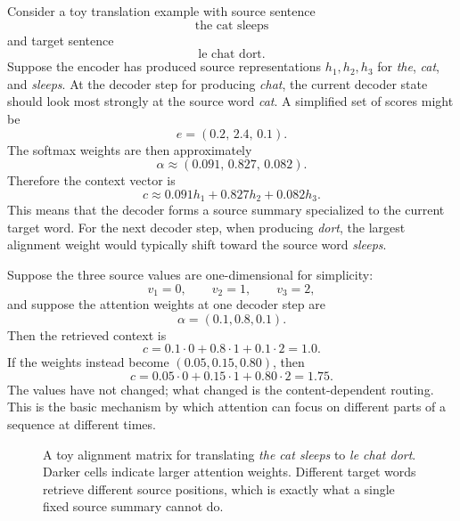 Consider a toy translation example with source sentence
\[
 \text{the cat sleeps}
\]
and target sentence
\[
 \text{le chat dort}.
\]
Suppose the encoder has produced source representations $h_1,h_2,h_3$ for \emph{the}, \emph{cat}, and \emph{sleeps}.
At the decoder step for producing \emph{chat}, the current decoder state should look most strongly at the source word \emph{cat}.
A simplified set of scores might be
\[
 e=(0.2,\,2.4,\,0.1).
\]
The softmax weights are then approximately
\[
 \alpha\approx(0.091,\,0.827,\,0.082).
\]
Therefore the context vector is
\[
 c \approx 0.091 h_1 + 0.827 h_2 + 0.082 h_3.
\]
This means that the decoder forms a source summary specialized to the current target word.
For the next decoder step, when producing \emph{dort}, the largest alignment weight would typically shift toward the source word \emph{sleeps}.

\begin{example}
Suppose the three source values are one-dimensional for simplicity:
\[
 v_1=0,
 \qquad
 v_2=1,
 \qquad
 v_3=2,
\]
and suppose the attention weights at one decoder step are
\[
 \alpha=(0.1,0.8,0.1).
\]
Then the retrieved context is
\[
 c = 0.1\cdot 0 + 0.8\cdot 1 + 0.1\cdot 2 = 1.0.
\]
If the weights instead become $(0.05,0.15,0.80)$, then
\[
 c = 0.05\cdot 0 + 0.15\cdot 1 + 0.80\cdot 2 = 1.75.
\]
The values have not changed; what changed is the content-dependent routing.
This is the basic mechanism by which attention can focus on different parts of a sequence at different times.
\end{example}

\begin{figure}[t]
\centering
{}
\caption{A toy alignment matrix for translating \emph{the cat sleeps} to \emph{le chat dort}. Darker cells indicate larger attention weights. Different target words retrieve different source positions, which is exactly what a single fixed source summary cannot do.}
\label{fig:alignment-matrix}
\end{figure}

